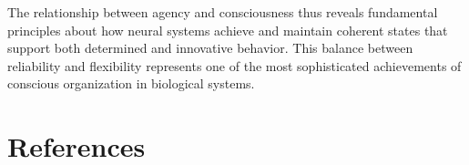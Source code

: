 \begin{refsection}
The relationship between agency and consciousness thus reveals fundamental principles about how neural systems achieve and maintain coherent states that support both determined and innovative behavior. This balance between reliability and flexibility represents one of the most sophisticated achievements of conscious organization in biological systems.

\newpage
\section{References}
\printbibliography[title={},heading=subbibliography]
\end{refsection}